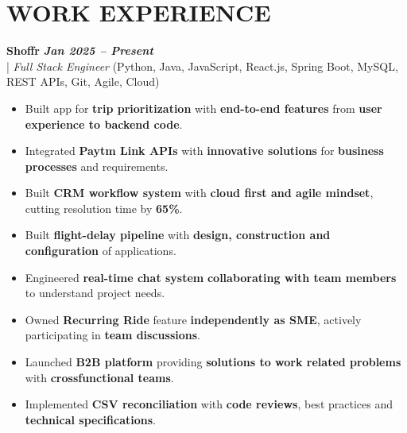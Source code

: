 \documentclass[10pt,a4paper]{article}
\begin{document}

\section*{WORK EXPERIENCE}
\small

\noindent
  \textbf{Shoffr} \hfill \textit{\textbf{Jan 2025 -- Present}} \\
  \;|\;
  \textit{Full Stack Engineer} (Python, Java, JavaScript, React.js, Spring Boot, MySQL, REST APIs, Git, Agile, Cloud)
\begin{itemize}



\item Built app for \textbf{trip prioritization} with \textbf{end-to-end features} from \textbf{user experience to backend code}.



\item Integrated \textbf{Paytm Link APIs} with \textbf{innovative solutions} for \textbf{business processes} and requirements.



\item Built \textbf{CRM workflow system} with \textbf{cloud first and agile mindset}, cutting resolution time by \textbf{65\%}.



\item Built \textbf{flight-delay pipeline} with \textbf{design, construction and configuration} of applications.



\item Engineered \textbf{real-time chat system} \textbf{collaborating with team members} to understand project needs.



\item Owned \textbf{Recurring Ride} feature \textbf{independently as SME}, actively participating in \textbf{team discussions}.



\item Launched \textbf{B2B platform} providing \textbf{solutions to work related problems} with \textbf{crossfunctional teams}.



\item Implemented \textbf{CSV reconciliation} with \textbf{code reviews}, best practices and \textbf{technical specifications}.



\end{itemize}
\end{document}
